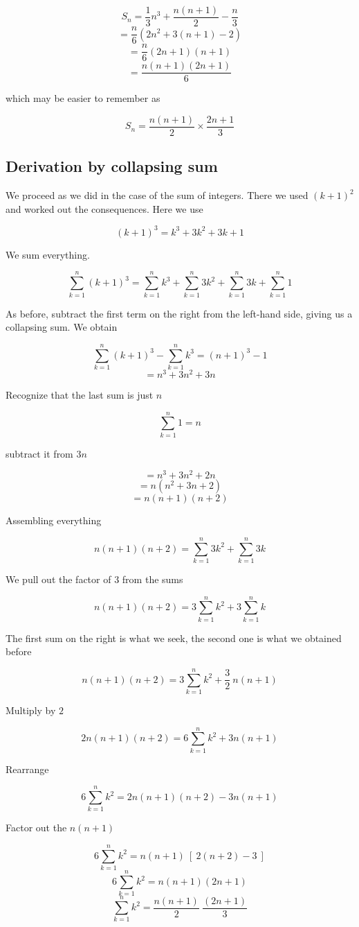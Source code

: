 \documentclass[11pt, oneside]{article}
\begin{document}
\[ S_n =  \frac{1}{3} n^3 + \frac{n(n+1)}{2} - \frac{n}{3} \]
\[ = \frac{n}{6} (2n^2 + 3(n+1) - 2) \]
\[ =  \frac{n}{6} (2n + 1)(n + 1) \]
\[ = \frac{n(n+1)(2n+1)}{6} \]

which may be easier to remember as

\[ S_n = \frac{n(n+1)}{2} \times \frac{2n + 1}{3} \]

\subsection*{Derivation by collapsing sum}

We proceed as we did in the case of the sum of integers.  There we used $(k+1)^2$ and worked out the consequences.  Here we use

\[ (k+1)^3 = k^3 + 3k^2 + 3k + 1 \]

We sum everything.

\[ \sum_{k=1}^n (k+1)^3 = \sum_{k=1}^n k^3 + \sum_{k=1}^n 3k^2 + \sum_{k=1}^n 3k + \sum_{k=1}^n 1 \]

As before, subtract the first term on the right from the left-hand side, giving us a collapsing sum.  We obtain

\[ \sum_{k=1}^n (k+1)^3 - \sum_{k=1}^n k^3 = (n+1)^3 - 1 \]
\[ = n^3 + 3n^2 + 3n \]

Recognize that the last sum is just $n$ 

\[ \sum_{k=1}^n 1 = n \]

subtract it from $3n$

\[ = n^3 + 3n^2 + 2n \]
\[ = n(n^2 + 3n + 2) \]
\[ = n(n+1)(n+2) \]

Assembling everything

\[ n(n+1)(n+2) = \sum_{k=1}^n 3k^2 + \sum_{k=1}^n 3k \]

We pull out the factor of $3$ from the sums

\[ n(n+1)(n+2) = 3\sum_{k=1}^n k^2 + 3\sum_{k=1}^n k  \]

The first sum on the right is what we seek, the second one is what we obtained before

\[ n(n+1)(n+2) = 3\sum_{k=1}^n k^2 + \frac{3}{2}\ n(n+1) \]

Multiply by $2$

\[ 2n(n+1)(n+2) = 6\sum_{k=1}^n k^2 + 3n(n+1) \]

Rearrange

\[ 6\sum_{k=1}^n k^2 = 2n(n+1)(n+2) - 3n(n+1) \]

Factor out the $n(n+1)$

\[ 6\sum_{k=1}^n k^2 = n(n+1) \ [ \ 2(n + 2) - 3 \ ] \]
\[ 6\sum_{k=1}^n k^2 = n(n+1)(2n + 1) \]
\[ \sum_{k=1}^n k^2 = \frac{n(n+1)}{2} \ \frac{(2n + 1)}{3}  \]
\end{document}
